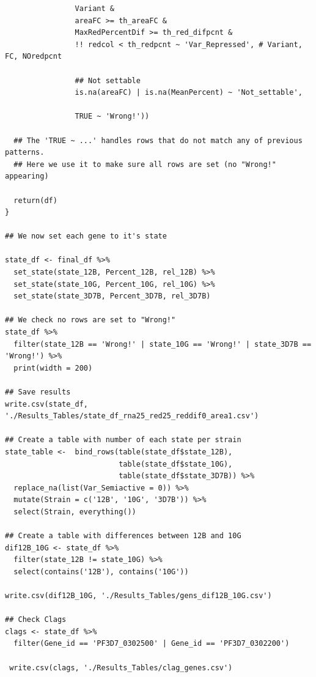 \documentclass[11pt]{article}
\begin{document}
\begin{verbatim}
                Variant &
                areaFC >= th_areaFC &
                MaxRedPercentDif >= th_red_difpcnt &
                !! redcol < th_redpcnt ~ 'Var_Repressed', # Variant, FC, NOredpcnt

                ## Not settable
                is.na(areaFC) | is.na(MeanPercent) ~ 'Not_settable',

                TRUE ~ 'Wrong!'))

  ## The 'TRUE ~ ...' handles rows that do not match any of previous patterns.
  ## Here we use it to make sure all rows are set (no "Wrong!" appearing)

  return(df)
}

## We now set each gene to it's state

state_df <- final_df %>%
  set_state(state_12B, Percent_12B, rel_12B) %>%
  set_state(state_10G, Percent_10G, rel_10G) %>%
  set_state(state_3D7B, Percent_3D7B, rel_3D7B)

## We check no rows are set to "Wrong!"
state_df %>%
  filter(state_12B == 'Wrong!' | state_10G == 'Wrong!' | state_3D7B == 'Wrong!') %>%
  print(width = 200)

## Save results
write.csv(state_df, './Results_Tables/state_df_rna25_red25_reddif0_area1.csv')

## Create a table with number of each state per strain
state_table <-  bind_rows(table(state_df$state_12B),
                          table(state_df$state_10G),
                          table(state_df$state_3D7B)) %>%
  replace_na(list(Var_Semiactive = 0)) %>%
  mutate(Strain = c('12B', '10G', '3D7B')) %>%
  select(Strain, everything())

## Create a table with differences between 12B and 10G
dif12B_10G <- state_df %>%
  filter(state_12B != state_10G) %>%
  select(contains('12B'), contains('10G'))

write.csv(dif12B_10G, './Results_Tables/gens_dif12B_10G.csv')

## Check Clags
clags <- state_df %>%
  filter(Gene_id == 'PF3D7_0302500' | Gene_id == 'PF3D7_0302200')

 write.csv(clags, './Results_Tables/clag_genes.csv')
\end{verbatim}
\end{document}
